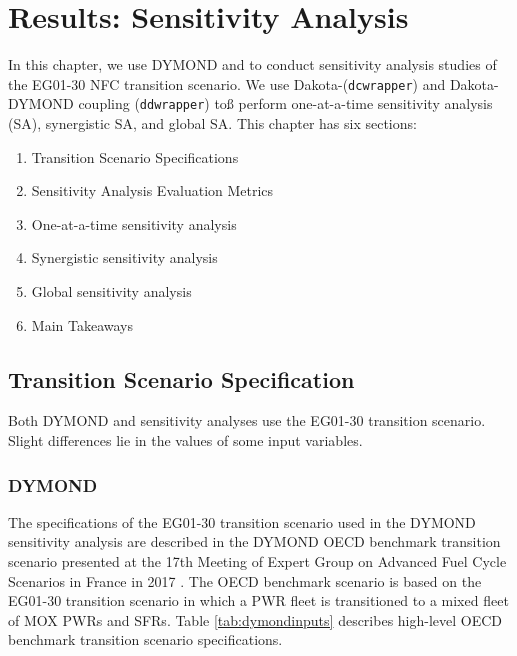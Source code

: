 \chapter{Results: Sensitivity Analysis}
In this chapter, we use DYMOND and \Cyclus to conduct 
sensitivity analysis studies of the 
EG01-30 \gls{NFC} transition scenario. 
We use Dakota-\Cyclus (\texttt{dcwrapper}) 
and Dakota-DYMOND coupling (\texttt{ddwrapper}) toß
perform  
one-at-a-time sensitivity analysis (SA), synergistic 
SA, and global SA. 
This chapter has six sections: 
\begin{enumerate}
    \item Transition Scenario Specifications 
    \item Sensitivity Analysis Evaluation Metrics 
    \item One-at-a-time sensitivity analysis
    \item Synergistic sensitivity analysis
    \item Global sensitivity analysis
    \item Main Takeaways 
\end{enumerate}

\section{Transition Scenario Specification}
Both DYMOND and \Cyclus sensitivity analyses 
use the EG01-30 transition scenario.
Slight differences lie in the values of some input variables. 

\subsection{DYMOND}
The specifications of the EG01-30 transition scenario used in the 
DYMOND sensitivity analysis
are described in the DYMOND OECD benchmark transition 
scenario presented at the 17th Meeting of Expert Group on Advanced 
Fuel Cycle Scenarios in France in 2017 
\cite{oecd_nuclear_energy_agency_wpfc_nodate}. 
The OECD benchmark scenario is based on the EG01-30 transition scenario 
in which a \gls{PWR} fleet is transitioned to
a mixed fleet of \gls{MOX} \glspl{PWR} and \glspl{SFR}. 
Table \ref{tab:dymondinputs} describes high-level OECD benchmark transition 
scenario specifications. 


